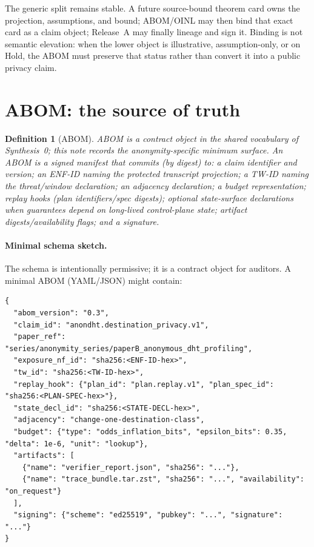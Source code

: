 \documentclass[11pt]{article}
\newtheorem{definition}{Definition}
\begin{document}
The generic split remains stable.  A future source-bound theorem card owns the projection, assumptions, and bound; ABOM/OINL may then bind that exact card as a claim object; Release~A may finally lineage and sign it.  Binding is not semantic elevation: when the lower object is illustrative, assumption-only, or on Hold, the ABOM must preserve that status rather than convert it into a public privacy claim.\cite{series:releaseproperty,series:theoremtopublicationspine}

\section{ABOM: the source of truth}
\begin{definition}[ABOM]\label{def:abom}
ABOM is a contract object in the shared vocabulary of Synthesis~0; this note records the anonymity-specific minimum surface.\cite{series:contractobjects}
An ABOM is a signed manifest that commits (by digest) to: a claim identifier and version; an ENF-ID naming the protected transcript projection; a TW-ID naming the threat/window declaration; an adjacency declaration; a budget representation; replay hooks (plan identifiers/spec digests); optional state-surface declarations when guarantees depend on long-lived control-plane state; artifact digests/availability flags; and a signature.
\end{definition}

\paragraph{Minimal schema sketch.}
The schema is intentionally permissive; it is a contract object for auditors.
A minimal ABOM (YAML/JSON) might contain:
\begin{lstlisting}
{
  "abom_version": "0.3",
  "claim_id": "anondht.destination_privacy.v1",
  "paper_ref": "series/anonymity_series/paperB_anonymous_dht_profiling",
  "exposure_nf_id": "sha256:<ENF-ID-hex>",
  "tw_id": "sha256:<TW-ID-hex>",
  "replay_hook": {"plan_id": "plan.replay.v1", "plan_spec_id": "sha256:<PLAN-SPEC-hex>"},
  "state_decl_id": "sha256:<STATE-DECL-hex>",
  "adjacency": "change-one-destination-class",
  "budget": {"type": "odds_inflation_bits", "epsilon_bits": 0.35, "delta": 1e-6, "unit": "lookup"},
  "artifacts": [
    {"name": "verifier_report.json", "sha256": "..."},
    {"name": "trace_bundle.tar.zst", "sha256": "...", "availability": "on_request"}
  ],
  "signing": {"scheme": "ed25519", "pubkey": "...", "signature": "..."}
}
\end{lstlisting}
\end{document}
